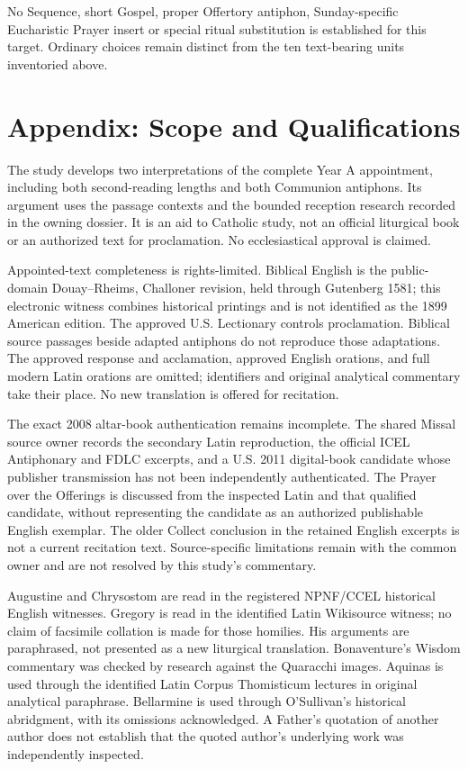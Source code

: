 No Sequence, short Gospel, proper Offertory antiphon, Sunday-specific Eucharistic Prayer insert or special ritual substitution is established for this target. Ordinary choices remain distinct from the ten text-bearing units inventoried above.

\section{Appendix: Scope and Qualifications}
The study develops two interpretations of the complete Year A appointment, including both second-reading lengths and both Communion antiphons. Its argument uses the passage contexts and the bounded reception research recorded in the owning dossier. It is an aid to Catholic study, not an official liturgical book or an authorized text for proclamation. No ecclesiastical approval is claimed.

Appointed-text completeness is rights-limited. Biblical English is the public-domain Douay--Rheims, Challoner revision, held through Gutenberg 1581; this electronic witness combines historical printings and is not identified as the 1899 American edition. The approved U.S. Lectionary controls proclamation. Biblical source passages beside adapted antiphons do not reproduce those adaptations. The approved response and acclamation, approved English orations, and full modern Latin orations are omitted; identifiers and original analytical commentary take their place. No new translation is offered for recitation.

The exact 2008 altar-book authentication remains incomplete. The shared Missal source owner records the secondary Latin reproduction, the official ICEL Antiphonary and FDLC excerpts, and a U.S. 2011 digital-book candidate whose publisher transmission has not been independently authenticated. The Prayer over the Offerings is discussed from the inspected Latin and that qualified candidate, without representing the candidate as an authorized publishable English exemplar. The older Collect conclusion in the retained English excerpts is not a current recitation text. Source-specific limitations remain with the common owner and are not resolved by this study's commentary.

Augustine and Chrysostom are read in the registered NPNF/CCEL historical English witnesses. Gregory is read in the identified Latin Wikisource witness; no claim of facsimile collation is made for those homilies. His arguments are paraphrased, not presented as a new liturgical translation. Bonaventure's Wisdom commentary was checked by research against the Quaracchi images. Aquinas is used through the identified Latin Corpus Thomisticum lectures in original analytical paraphrase. Bellarmine is used through O'Sullivan's historical abridgment, with its omissions acknowledged. A Father's quotation of another author does not establish that the quoted author's underlying work was independently inspected.

